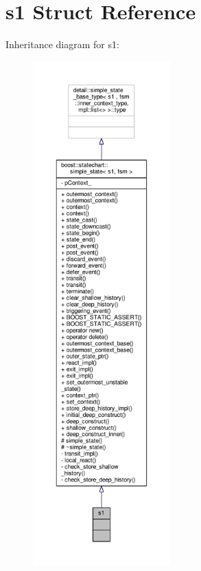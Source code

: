 \hypertarget{structs1}{}\section{s1 Struct Reference}
\label{structs1}


Inheritance diagram for s1\+:
\nopagebreak
\begin{figure}[H]
\begin{center}
\leavevmode
\includegraphics[height=550pt]{structs1__inherit__graph}
\end{center}
\end{figure}



